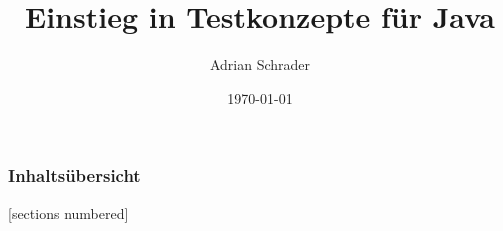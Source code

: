 \documentclass[10pt]{beamer}
\title{Einstieg in Testkonzepte für Java}
\subtitle{}
\date{\today}
\author{Adrian Schrader}
\institute{Informatik 2h, Herr Endstrasser}
\begin{document}
\maketitle

\begin{frame}
  \frametitle{Inhaltsübersicht}
  [sections numbered]
  \tableofcontents
\end{frame}





\begin{frame}[allowframebreaks]

  \nocite{*}
  \printbibliography{}

\end{frame}


\end{document}
